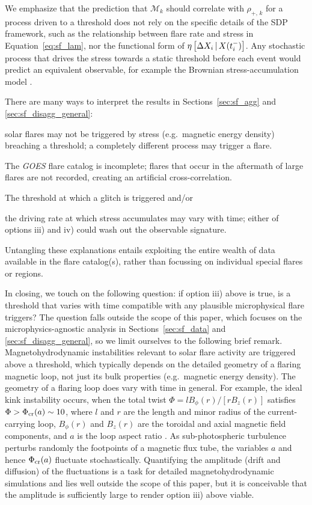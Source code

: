 We emphasize that the prediction that $\mathcal{M}_k$ should correlate with $\rho_{+,\,k}$ for a process driven to a threshold does not rely on the specific details of the SDP framework, such as the relationship between flare rate and stress in Equation~\eqref{eq:sf_lam}, nor the functional form of $\eta\left[\Delta X_{i}\,|\,X(t_i^-)\right]$. Any stochastic process that drives the stress towards a static threshold before each event would predict an equivalent observable, for example the Brownian stress-accumulation model \citep{Carlin2020bsa}.

There are many ways to interpret the results in Sections~\ref{sec:sf_agg} and \ref{sec:sf_disagg_general}: \begin{enumerate*}
	\item solar flares may not be triggered by stress (e.g.~magnetic energy density) breaching a threshold; a completely different process may trigger a flare.
	\item The \emph{GOES} flare catalog is incomplete; flares that occur in the aftermath of large flares are not recorded, creating an artificial cross-correlation.
	\item The threshold at which a glitch is triggered and/or
	\item the driving rate at which stress accumulates may vary with time; either of options iii) and iv) could wash out the observable signature.
\end{enumerate*}
Untangling these explanations entails exploiting the entire wealth of data available in the flare catalog(s), rather than focussing on individual special flares or regions. 

In closing, we touch on the following question: if option iii) above is true, is a threshold that varies with time compatible with any plausible microphysical flare triggers? The question falls outside the scope of this paper, which focuses on the microphysics-agnostic analysis in Sections~\ref{sec:sf_data} and \ref{sec:sf_disagg_general}, so we limit ourselves to the following brief remark. Magnetohydrodynamic instabilities relevant to solar flare activity are triggered above a threshold, which typically depends on the detailed geometry of a flaring magnetic loop, not just its bulk properties (e.g.~magnetic energy density). The geometry of a flaring loop does vary with time in general. For example, the ideal kink instability occurs, when the total twist $\Phi = l B_\phi(r) / [r B_z(r)]$ satisfies $\Phi > \Phi_{\rm cr}(a) \sim 10$, where $l$ and $r$ are the length and minor radius of the current-carrying loop, $B_\phi(r)$ and $B_z(r)$ are the toroidal and axial magnetic field components, and $a$ is the loop aspect ratio \citep{Torok2004}. As sub-photospheric turbulence perturbs randomly the footpoints of a magnetic flux tube, the variables $a$ and hence $\Phi_{\rm cr}(a)$ fluctuate stochastically. Quantifying the amplitude (drift and diffusion) of the fluctuations is a task for detailed magnetohydrodynamic simulations and lies well outside the scope of this paper, but it is conceivable that the amplitude is sufficiently large to render option iii) above viable.

